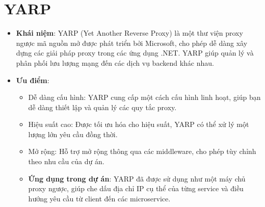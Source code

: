 \documentclass[../index.tex]{subfiles}
\begin{document}
    \section{YARP}
    \begin{itemize}
        \item \textbf{Khái niệm}: YARP (Yet Another Reverse Proxy) là một thư viện
            proxy ngược mã nguồn mở được phát triển bởi Microsoft, cho phép dễ
            dàng xây dựng các giải pháp proxy trong các ứng dụng .NET. YARP giúp
            quản lý và phân phối lưu lượng mạng đến các dịch vụ backend khác
            nhau.

        \item \textbf{Ưu điểm}:
            \begin{itemize}
                \item Dễ dàng cấu hình: YARP cung cấp một cách cấu hình linh
                    hoạt, giúp bạn dễ dàng thiết lập và quản lý các quy tắc proxy.

                \item Hiệu suất cao: Được tối ưu hóa cho hiệu suất, YARP có thể xử
                    lý một lượng lớn yêu cầu đồng thời.

                \item Mở rộng: Hỗ trợ mở rộng thông qua các middleware, cho phép
                    tùy chỉnh theo nhu cầu của dự án.

                \item \textbf{Ứng dụng trong dự án}: YARP đã được sử dụng như một
                    máy chủ proxy ngược, giúp che dấu địa chỉ IP cụ thể của từng
                    service và điều hướng yêu cầu từ client đến các microservice.
            \end{itemize}
    \end{itemize}

\end{document}
